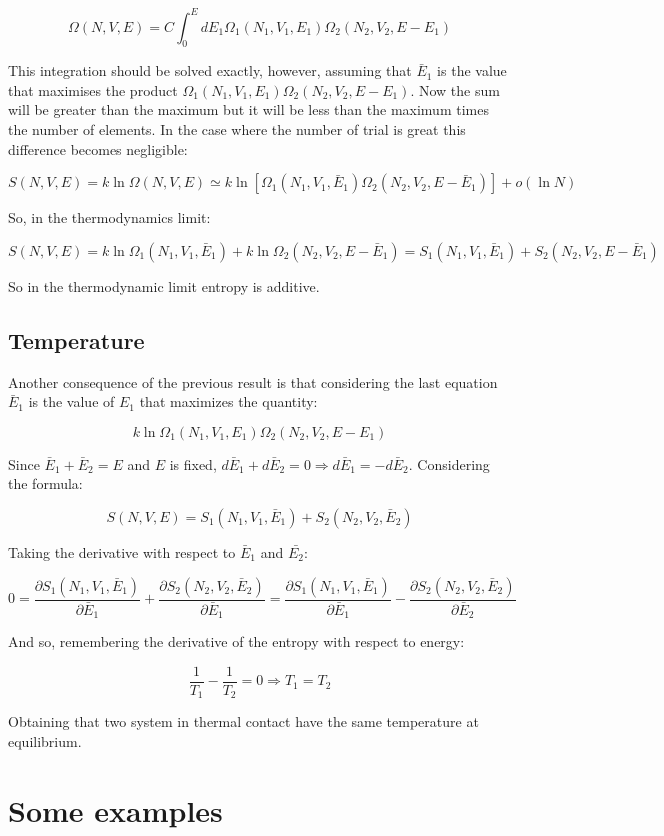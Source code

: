 $$\Omega(N, V, E) = C\int_0^EdE_1\Omega_1(N_1, V_1, E_1)\Omega_2(N_2, V_2, E - E_1)$$

This integration should be solved exactly, however, assuming that $\bar{E}_1$ is the value that maximises the product $\Omega_1(N_1, V_1, E_1)\Omega_2(N_2, V_2, E - E_1)$.
Now the sum will be greater than the maximum but it will be less than the maximum times the number of elements.
In the case where the number of trial is great this difference becomes negligible:

$$S(N, V, E) = k\ln\Omega(N, V, E)\simeq k\ln[\Omega_1(N_1, V_1, \bar{E}_1)\Omega_2(N_2, V_2, E-\bar{E}_1)] + o(\ln N)$$

So, in the thermodynamics limit:

$$S(N, V, E) = k\ln\Omega_1(N_1, V_1, \bar{E}_1) + k\ln\Omega_2(N_2, V_2, E-\bar{E}_1) = S_1(N_1, V_1, \bar{E}_1) + S_2(N_2, V_2, E - \bar{E}_1)$$

So in the thermodynamic limit entropy is additive.

	\subsection{Temperature}
	Another consequence of the previous result is that considering the last equation $\bar{E}_1$ is the value of $E_1$ that maximizes the quantity:

	$$k\ln\Omega_1(N_1, V_1, E_1)\Omega_2(N_2, V_2, E - E_1)$$

	Since $\bar{E}_1+\bar{E}_2 = E$ and $E$ is fixed, $d\bar{E}_1 + d\bar{E}_2 = 0\Rightarrow d\bar{E}_1 = -d\bar{E}_2$.
	Considering the formula:

	$$S(N, V, E) = S_1(N_1, V_1, \bar{E}_1) + S_2(N_2, V_2, \bar{E}_2)$$

	Taking the derivative with respect to $\bar{E}_1$ and $\bar{E_2}$:

	$$0 = \frac{\partial S_1(N_1, V_1, \bar{E}_1)}{\partial\bar{E}_1} + \frac{\partial S_2(N_2, V_2, \bar{E}_2)}{\partial\bar{E}_1} = \frac{\partial S_1(N_1, V_1, \bar{E}_1)}{\partial\bar{E}_1} - \frac{\partial S_2(N_2, V_2, \bar{E}_2)}{\partial\bar{E}_2}$$

	And so, remembering the derivative of the entropy with respect to energy:

	$$\frac{1}{T_1}-\frac{1}{T_2} = 0\Rightarrow T_1 = T_2$$

	Obtaining that two system in thermal contact have the same temperature at equilibrium.

\section{Some examples}

